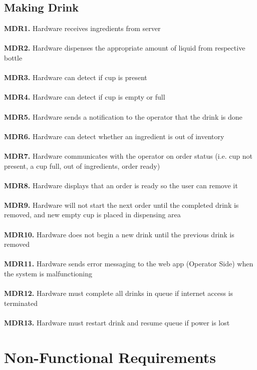 \documentclass{article}
\begin{document}
\subsection{Making Drink}
    \noindent\textbf{MDR1.} Hardware receives ingredients from server \\\\
    \textbf{MDR2.} Hardware dispenses the appropriate amount of liquid from respective bottle \\\\
    \textbf{MDR3.} Hardware can detect if cup is present \\\\
    \textbf{MDR4.} Hardware can detect if cup is empty or full \\\\
    \textbf{MDR5.} Hardware sends a notification to the operator that the drink is done \\\\
    \textbf{MDR6.} Hardware can detect whether an ingredient is out of inventory \\\\
    \textbf{MDR7.} Hardware communicates with the operator on order status (i.e. cup not present, a cup full, out of ingredients, order ready) \\\\
    \textbf{MDR8.} Hardware displays that an order is ready so the user can remove it \\\\
    \textbf{MDR9.} Hardware will not start the next order until the completed drink is removed, and new empty cup is placed in dispensing area \\\\
    \textbf{MDR10.} Hardware does not begin a new drink until the previous drink is removed \\\\
    \textbf{MDR11.} Hardware sends error messaging to the web app (Operator Side) when the system is malfunctioning\\\\
    \textbf{MDR12.} Hardware must complete all drinks in queue if internet access is terminated \\\\
    \textbf{MDR13.} Hardware must restart drink and resume queue if power is lost \\

\section{Non-Functional Requirements}
\end{document}
